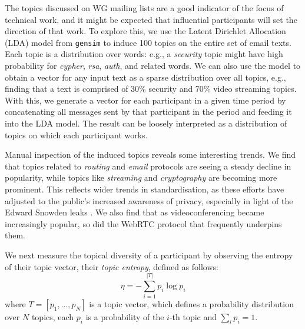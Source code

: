 \documentclass[twocolumn,10pt]{article}
\newcommand{\pb}[1]{\vspace{0.75ex}\noindent{\textbf{#1}}}
\begin{document}
\pb{Topics of Discussion} 
The topics discussed on WG mailing lists are a good indicator of the focus
of technical work, and it might be expected that influential participants
will set the direction of that work.  To explore this, we use the Latent
Dirichlet Allocation (LDA) \cite{blei2003latent,hoffman2010online} model
from \texttt{gensim} \cite{rehurek_lrec} to induce 100 topics on the entire
set of email texts. 
Each topic is a distribution over words: e.g., a \emph{security} topic might
have high probability for \emph{cypher}, \emph{rsa}, \emph{auth}, and
related words. We can also use the model to obtain a vector for any input
text as a sparse distribution over all topics, e.g., finding that a text is
comprised of 30\% security and 70\% video streaming topics. With this, we
generate a vector for each participant in a given time period by
concatenating all messages sent by that participant in the period and
feeding it into the LDA model. The result can be loosely interpreted as a
distribution of topics on which each participant works.

Manual inspection of the induced topics reveals some interesting trends. We
find that topics related to \emph{routing} and \emph{email} protocols are
seeing a steady decline in popularity, while topics like \emph{streaming}
and \emph{cryptography} are becoming more prominent. This reflects wider
trends in standardisation, as these efforts have adjusted to the public's
increased awareness of privacy, especially in light of the Edward Snowden
leaks \cite{RFC7258}. We also find that as videoconferencing became
increasingly popular, so did the WebRTC protocol that frequently underpins
them.

We next measure the topical diversity of a participant by observing the
entropy of their topic vector, their \emph{topic entropy}, defined as
follows:
\begin{equation}
  \eta = - \sum_{i=1}^{|T|} p_i \log p_i \nonumber
\end{equation}
where $T = [p_1, ..., p_N]$ is a topic vector, which defines a probability
distribution over $N$ topics, each $p_i$ is a probability of the $i$-th
topic and $\sum_i p_i = 1$.
\end{document}
